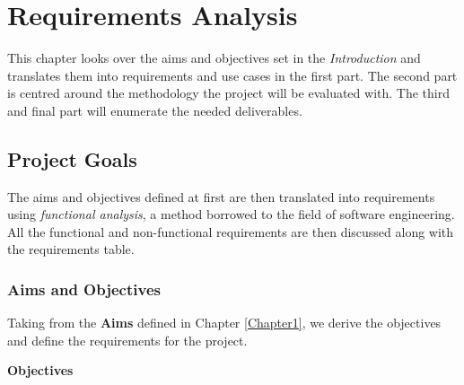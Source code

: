 \chapter{Requirements Analysis} %

\label{Chapter4} %



This chapter looks over the aims and objectives set in the \emph{Introduction} and translates them into requirements and use cases in the first part. The second part is centred around the methodology the project will be evaluated with. The third and final part will enumerate the needed deliverables.

\section{Project Goals}

The aims and objectives defined at first are then translated into requirements using \emph{functional analysis}, a method borrowed to the field of software engineering. All the functional and non-functional requirements are then discussed along with the requirements table.


\subsection{Aims and Objectives}

Taking from the \textbf{Aims} defined in Chapter \ref{Chapter1}, we derive the objectives and define the requirements for the project.

\textbf{Objectives}

